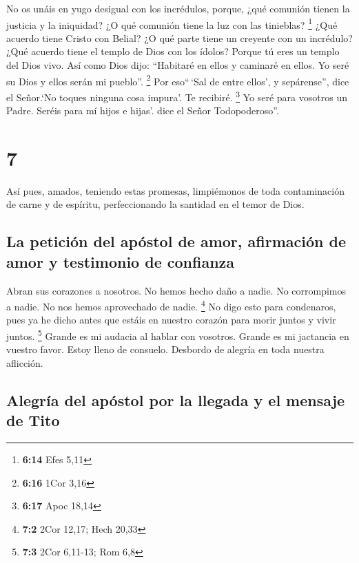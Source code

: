  No os unáis en yugo desigual con los incrédulos, porque,
¿qué comunión tienen la justicia y la iniquidad? ¿O qué comunión tiene
la luz con las tinieblas? \footnote{\textbf{6:14} Efes 5,11}
 ¿Qué acuerdo tiene Cristo con Belial? ¿O qué parte tiene
un creyente con un incrédulo?  ¿Qué acuerdo tiene el
templo de Dios con los ídolos? Porque tú eres un templo del Dios vivo.
Así como Dios dijo: ``Habitaré en ellos y caminaré en ellos. Yo seré su
Dios y ellos serán mi pueblo''. \footnote{\textbf{6:16} 1Cor 3,16}
 Por eso``\,`Sal de entre ellos', y sepárense'', dice el
Señor.`No toques ninguna cosa impura'. Te recibiré. \footnote{\textbf{6:17}
  Apoc 18,14}  Yo seré para vosotros un Padre. Seréis
para mí hijos e hijas'. dice el Señor Todopoderoso''.

\hypertarget{section-6}{%
\section{7}\label{section-6}}

 Así pues, amados, teniendo estas promesas, limpiémonos de
toda contaminación de carne y de espíritu, perfeccionando la santidad en
el temor de Dios.

\hypertarget{la-peticiuxf3n-del-apuxf3stol-de-amor-afirmaciuxf3n-de-amor-y-testimonio-de-confianza}{%
\subsection{La petición del apóstol de amor, afirmación de amor y
testimonio de
confianza}\label{la-peticiuxf3n-del-apuxf3stol-de-amor-afirmaciuxf3n-de-amor-y-testimonio-de-confianza}}

 Abran sus corazones a nosotros. No hemos hecho daño a
nadie. No corrompimos a nadie. No nos hemos aprovechado de nadie.
\footnote{\textbf{7:2} 2Cor 12,17; Hech 20,33}  No digo
esto para condenaros, pues ya he dicho antes que estáis en nuestro
corazón para morir juntos y vivir juntos. \footnote{\textbf{7:3} 2Cor
  6,11-13; Rom 6,8}  Grande es mi audacia al hablar con
vosotros. Grande es mi jactancia en vuestro favor. Estoy lleno de
consuelo. Desbordo de alegría en toda nuestra aflicción.

\hypertarget{alegruxeda-del-apuxf3stol-por-la-llegada-y-el-mensaje-de-tito}{%
\subsection{Alegría del apóstol por la llegada y el mensaje de
Tito}\label{alegruxeda-del-apuxf3stol-por-la-llegada-y-el-mensaje-de-tito}}


